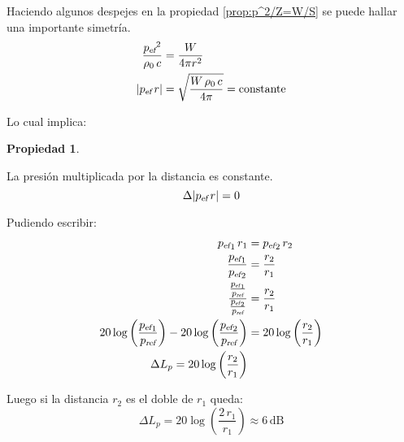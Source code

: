 \documentclass[a5paper,12pt,twoside]{book}
\newtheorem{prop}{{Propiedad}}[chapter]
\begin{document}
Haciendo algunos despejes en la propiedad \ref{prop:p^2/Z=W/S} se puede hallar una importante simetría.
\begin{align*}
    \frac{{{{p}_\textsl{{ef}}}}^2}{\rho_0 \, c} &= \frac{W}{4\pi r^2}
    \\
    {\left| {{{{p}_\textsl{{ef}}}} \, r} \right|} &= \sqrt{\frac{W \, \rho_0 \, c}{4\pi}} = \textrm{constante}
\end{align*}

Lo cual implica:

\begin{mdframed}[style=MyFrame1]
    \begin{prop}
    \end{prop}
    La presión multiplicada por la distancia es constante.
    \begin{equation*}
        \Delta {\left| {{{{p}_\textsl{{ef}}}} \, r} \right|} = 0
    \end{equation*}
\end{mdframed}

Pudiendo escribir:
\begin{align*}
    {{{{p}_\textsl{{ef}}}}}_1 \, r_1 &= {{{{p}_\textsl{{ef}}}}}_2 \, r_2
    \\
    \frac{{{{{p}_\textsl{{ef}}}}}_1}{{{{{p}_\textsl{{ef}}}}}_2} &= \frac{r_2}{r_1}
    \\
    \frac{\tfrac{{{{{p}_\textsl{{ef}}}}}_1}{{{p}_\textsl{{ref}}}}}{\tfrac{{{{{p}_\textsl{{ef}}}}}_2}{{{p}_\textsl{{ref}}}}} &= \frac{r_2}{r_1}
    \\
    20 \log \left( \frac{{{{{p}_\textsl{{ef}}}}}_1}{{{p}_\textsl{{ref}}}} \right) - 20 \log \left( \frac{{{{{p}_\textsl{{ef}}}}}_2}{{{p}_\textsl{{ref}}}} \right) &= 20 \log \left( \frac{r_2}{r_1} \right)
    \\
    \Delta L_p = 20 \log \left( \frac{r_2}{r_1} \right)
\end{align*}

Luego si la distancia $r_2$ es el doble de $r_1$ queda:
\begin{equation*}
    \Delta L_p = 20 \log \left( \frac{2 \, r_1}{r_1} \right) \approx 6\,\si{\deci\bel}
\end{equation*}






\end{document}
